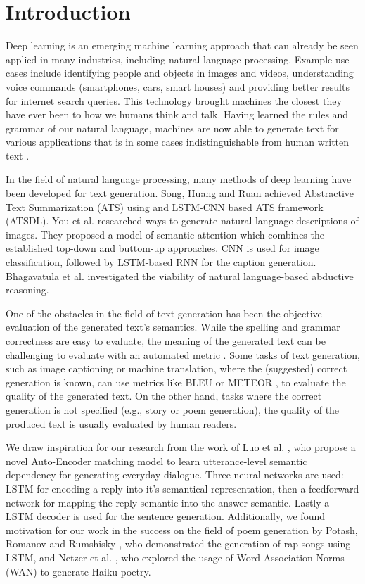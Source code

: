 \documentclass{acm_proc_article-sp}
\begin{document}
\section{Introduction}

Deep learning is an emerging machine learning approach that can already be seen applied in many industries, including natural language processing. Example use cases include identifying people and objects in images and videos, understanding voice commands (smartphones, cars, smart houses) and providing better results for internet search queries. This technology brought machines the closest they have ever been to how we humans think and talk. Having learned the rules and grammar of our natural language, machines are now able to generate text for various applications that is in some cases indistinguishable from human written text \cite{pawade2018story}.

In the field of natural language processing, many methods of deep learning have been developed for text generation. Song, Huang and Ruan \cite{song2019abstractive} achieved Abstractive Text Summarization (ATS) using and LSTM-CNN based ATS framework (ATSDL). You et al. \cite{You_2016_CVPR} researched ways to generate natural language descriptions of images. They proposed a model of semantic attention which combines the established top-down and buttom-up approaches. CNN is used for image classification, followed by LSTM-based RNN for the caption generation. Bhagavatula et al. \cite{bhagavatula2020abductive} investigated the viability of natural language-based abductive reasoning.

One of the obstacles in the field of text generation has been the objective evaluation of the generated text's semantics. While the spelling and grammar correctness are easy to evaluate, the meaning of the generated text can be challenging to evaluate with an automated metric \cite{celikyilmaz2020evaluation}. Some tasks of text generation, such as image captioning or machine translation, where the (suggested) correct generation is known, can use metrics like BLEU \cite{papineni2002bleu} or METEOR \cite{banerjee2005meteor}, to evaluate the quality of the generated text. On the other hand, tasks where the correct generation is not specified (e.g., story \cite{pawade2018story} or poem \cite{zhang2014chinese} generation), the quality of the produced text is usually evaluated by human readers.

We draw inspiration for our research from the work of Luo et al. \cite{luo2018autoencoder}, who propose a novel Auto-Encoder matching model to learn utterance-level semantic dependency for generating everyday dialogue. Three neural networks are used: LSTM for encoding a reply into it's semantical representation, then a feedforward network for mapping the reply semantic into the answer semantic. Lastly a LSTM decoder is used for the sentence generation. Additionally, we found motivation for our work in the success on the field of poem generation by Potash, Romanov and Rumshisky \cite{potash2015ghostwriter}, who demonstrated the generation of rap songs using LSTM, and Netzer et al. \cite{netzer2009gaiku}, who explored the usage of Word Association Norms (WAN) to generate Haiku poetry.
\end{document}
